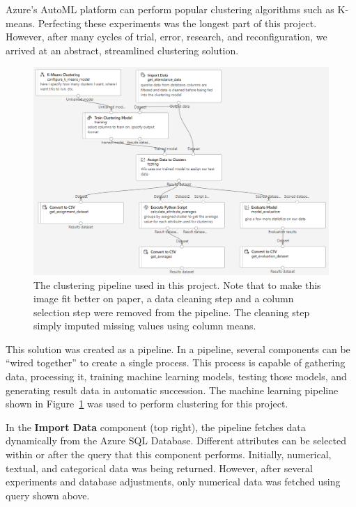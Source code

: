Azure's AutoML platform can perform popular clustering algorithms such as K-means. Perfecting these experiments was the longest part of this project. However, after many cycles of trial, error, research, and reconfiguration, we arrived at an abstract, streamlined clustering solution.

\begin{figure}[ht]
  \centering
  \includegraphics[width=\textwidth]{figures/clusteringPipeline.png}
  \caption{The clustering pipeline used in this project. Note that to make this image fit better on paper, a data cleaning step and a column selection step were removed from the pipeline. The cleaning step simply imputed missing values using column means.}
  \label{fig:clusteringPipeline}
\end{figure}

This solution was created as a pipeline. In a pipeline, several components can be ``wired together'' to create a single process. This process is capable of gathering data, processing it, training machine learning models, testing those models, and generating result data in automatic succession. The machine learning pipeline shown in Figure~\ref{fig:clusteringPipeline} was used to perform clustering for this project.

In the {\bf Import Data} component (top right), the pipeline fetches data dynamically from the Azure SQL Database. Different attributes can be selected within or after the query that this component performs. Initially, numerical, textual, and categorical data was being returned. However, after several experiments and database adjustments, only numerical data was fetched using query shown above.

